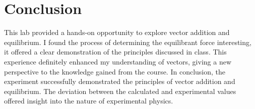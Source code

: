 \documentclass{report}
\begin{document}
    \bigbreak \noindent 
    \section{Conclusion}
    \bigbreak \noindent 
    This lab provided a hands-on opportunity to explore vector addition and equilibrium. I found the process of determining the equilibrant force interesting, it offered a clear demonstration of the principles discussed in class. 
    \bigbreak \noindent 
    This experience definitely enhanced my understanding of vectors, giving a new perspective to the knowledge gained from the course. 
    \bigbreak \noindent 
        In conclusion, the experiment successfully demonstrated the principles of vector addition and equilibrium. The deviation between the calculated and experimental values offered insight into the nature of experimental physics. 











    
\end{document}
